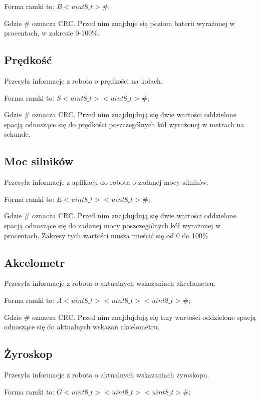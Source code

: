 \documentclass[10pt, a4paper]{article}
\begin{document}
Forma ramki to: $B<uint8\_t>\#$;
\newline

Gdzie \# oznacza CRC. Przed nim znajduje się poziom baterii wyrażonej 
w procentach, w zakresie 0-100\%.



\subsection{Prędkość}
Przesyła informacje z robota o prędkości na kołach.

Forma ramki to: $S<uint8\_t> <uint8\_t>\#$;
\newline

Gdzie \# oznacza CRC. Przed nim znajdujdują się dwie wartości oddzielone spacją
odnoszące się do prędkości poszczególnych kół wyrażonej w metrach na sekunde.



\subsection{Moc silników}
Przesyła informacje z aplikacji do robota o zadanej mocy silników.

Forma ramki to: $E<uint8\_t> <uint8\_t>\#$;
\newline

Gdzie \# oznacza CRC. Przed nim znajdujdują się dwie wartości oddzielone spacją
odnoszące się do zadanej mocy poszczególnych kół wyrażonej w procentach.
Zakresy tych wartości musza mieścić się od 0 do 100\%



\subsection{Akcelometr}
Przesyła informacje z robota o aktualnych wskazaniach akcelometru.

Forma ramki to: $A<uint8\_t> <uint8\_t> <uint8\_t>\#$;
\newline

Gdzie \# oznacza CRC. Przed nim znajdujdują się trzy wartości oddzielone spacją
odnoszące się do aktualnych wskazań akcelometru.


\subsection{Żyroskop}
Przesyła informacje z robota o aktualnych wskazaniach żyroskopu.

Forma ramki to: $G<uint8\_t> <uint8\_t> <uint8\_t>\#$;
\newline
\end{document}
